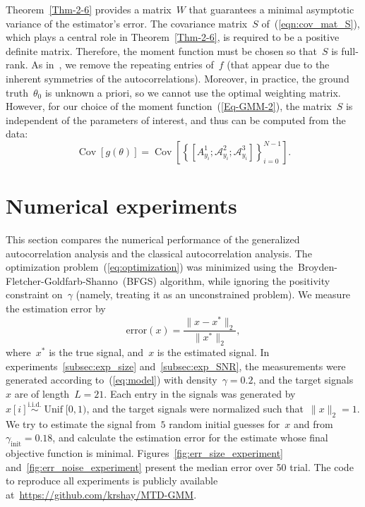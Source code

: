 \documentclass{article}
\DeclareMathOperator{\Unif}{Unif}
\newcommand{\A}[0]{\mathcal{A}}
\newcommand{\Cov}[0]{\operatorname{Cov}}
\begin{document}
Theorem~\ref{Thm-2-6} provides a matrix~$W$ {that} guarantees a minimal asymptotic variance of the estimator’s error. The covariance matrix~$S$ {of~(\ref{eqn:cov_mat_S}), which plays a central role in Theorem~\ref{Thm-2-6},} is required to be a positive definite matrix. Therefore, the moment function must be chosen so that~$S$ is full-rank. As in~\cite{abas2021generalized},  we remove the repeating entries of~$f$ (that appear due to the inherent symmetries of the autocorrelations). Moreover, in practice, the ground truth~$\theta_0$ is unknown a priori, so we cannot use the optimal weighting matrix. However, for our choice of the moment function~(\ref{Eq-GMM-2}), the matrix~$S$ is independent of the parameters of interest, and thus can be computed from the data:
	\begin{equation}\label{Eq-2-7}
		\Cov[g(\theta)] = \Cov\left[\left\{[A_{y_i}^1;\A_{y_i}^2;\A_{y_i}^3]\right\}_{i = 0}^{N - 1}\right].
	\end{equation}


\section{Numerical experiments}
\label{sec:numerical}
This section compares the numerical performance of the generalized autocorrelation analysis and the classical autocorrelation analysis. The optimization problem~(\ref{eq:optimization}) was minimized using the~\mbox{Broyden-Fletcher-Goldfarb-Shanno}~(BFGS) algorithm, while ignoring the positivity constraint on~$\gamma$ (namely, treating it as an unconstrained problem).  We measure the estimation error by
\begin{equation*}
\text{error}(x) = \frac{\|x - x^*\|_2}{\|x^*\|_2},
\end{equation*}
where~$x^*$ is the true signal, and~$x$ is the estimated signal. In experiments~\ref{subsec:exp_size} and~\ref{subsec:exp_SNR}, the measurements were generated according to~(\ref{eq:model}) with density~\mbox{$\gamma = 0.2$}, and the target signals~$x$ are of length~\mbox{$L = 21$}. Each entry in the signals was generated by~$x[i] \overset{\text{i.i.d.}}{\sim} \Unif[0, 1)$, and the target signals were normalized such that~$\|x\|_2  =1$. We try to estimate the signal from~$5$ random initial guesses for~$x$ and from~\mbox{$\gamma_{\text{init}} = 0.18$}, and calculate the estimation error for the estimate whose final objective function is minimal. Figures~\ref{fig:err_size_experiment} and~\ref{fig:err_noise_experiment} present the median error over 50 trial. The code to reproduce all experiments is publicly available at~\url{https://github.com/krshay/MTD-GMM}.
\end{document}
